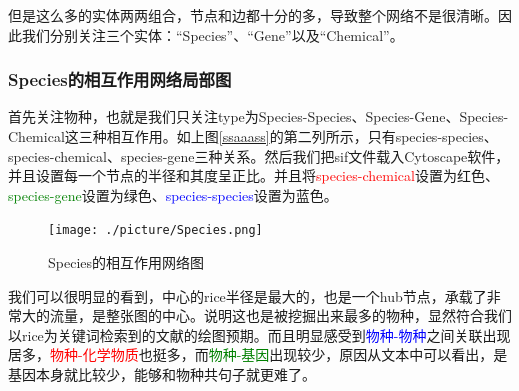 \documentclass[12pt]{article}
\begin{document}
但是这么多的实体两两组合，节点和边都十分的多，导致整个网络不是很清晰。因此我们分别关注三个实体：“Species”、“Gene”以及“Chemical”。\par
\subsubsection{Species的相互作用网络局部图}
首先关注物种，也就是我们只关注type为Species-Species、Species-Gene、Species-Chemical这三种相互作用。如上图\ref{ssaaass}的第二列所示，只有species-species、species-chemical、species-gene三种关系。然后我们把sif文件载入Cytoscape软件，并且设置每一个节点的半径和其度呈正比。并且将\textcolor{red}{species-chemical}设置为红色、\textcolor{green}{species-gene}设置为绿色、\textcolor{blue}{species-species}设置为蓝色。\par

\begin{figure}[H]
  \centering
  \texttt{[image: ./picture/Species.png]} %
  \caption{Species的相互作用网络图} %
  \label{xxxxxxx} %
\end{figure}
我们可以很明显的看到，中心的rice半径是最大的，也是一个hub节点，承载了非常大的流量，是整张图的中心。说明这也是被挖掘出来最多的物种，显然符合我们以rice为关键词检索到的文献的绘图预期。而且明显感受到\textcolor{blue}{物种-物种}之间关联出现居多，\textcolor{red}{物种-化学物质}也挺多，而\textcolor{green}{物种-基因}出现较少，原因从文本中可以看出，是基因本身就比较少，能够和物种共句子就更难了。\par
\end{document}
